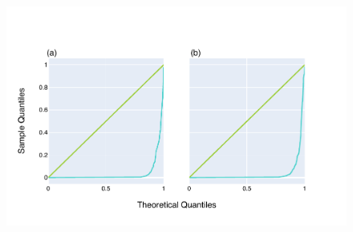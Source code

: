 \begin{figure}[!h]
\centering
\includegraphics[width=\textwidth]{figures/plots/synthetic/chi2/197113_332182_17210.pdf}
\caption{}
\label{fig:synthetic/chi2}
\end{figure}